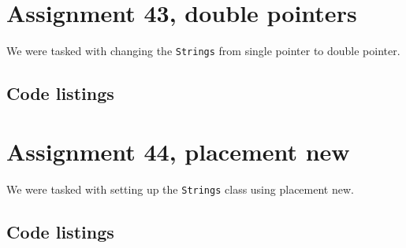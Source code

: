 \documentclass[11pt]{article}
\begin{document}
\section*{Assignment 43, double pointers}
We were tasked with changing the \texttt{Strings} from single pointer to double pointer.

\subsection*{Code listings}










\section*{Assignment 44, placement new}
We were tasked with setting up the \texttt{Strings} class using placement new.

\subsection*{Code listings}









\end{document}

